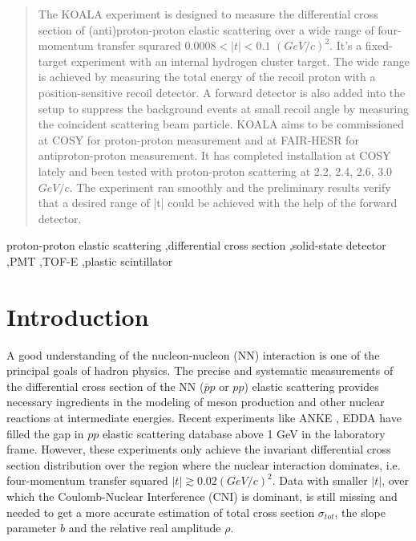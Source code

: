 \documentclass[number,5p]{elsarticle}
\begin{document}
\begin{frontmatter}
\begin{abstract}
    The KOALA experiment is designed to measure the differential cross section
    of (anti)proton-proton elastic scattering over a wide range of four-momentum
    transfer squrared $0.0008 < |t| < 0.1$ $(GeV/c)^2$.
    It's a fixed-target experiment with an internal hydrogen cluster target.
    The wide range is achieved by measuring the total energy of the recoil proton with a
    position-sensitive recoil detector.
    A forward detector is also added into the setup to suppress the background
    events at small recoil angle by measuring the coincident scattering beam particle.
    KOALA aims to be commissioned at COSY for proton-proton measurement and at
    FAIR-HESR for antiproton-proton measurement.
    It has completed installation at COSY lately and been tested with proton-proton
    scattering at 2.2, 2.4, 2.6, 3.0 $GeV/c$.
    The experiment ran smoothly and the preliminary results verify that a desired range of |t| could be achieved with the help of
    the forward detector.

  \end{abstract}

  \begin{keyword}
    proton-proton elastic scattering 
    \sep differential cross section
    \sep solid-state detector
    \sep PMT
    \sep TOF-E
    \sep plastic scintillator
  \end{keyword}

\end{frontmatter}



\section{Introduction}
\label{sec:introduction}

A good understanding of the nucleon-nucleon (NN) interaction is one of the principal goals of hadron physics.
The precise and systematic measurements of the differential cross section of the
NN ($\bar{p}p$ or $pp$) elastic scattering provides necessary ingredients
in the modeling of meson production and other nuclear reactions at intermediate energies.
Recent experiments like ANKE \cite{ANKE}, EDDA \cite{EDDA} have filled the gap
in $pp$ elastic scattering database above 1 GeV in the laboratory frame.
However, these experiments only achieve the invariant differential cross section distribution over the region where the nuclear interaction dominates, 
i.e. four-momentum transfer squared \(|t| \gtrsim 0.02 (GeV/c)^2\).
Data with smaller \(|t|\), over which the Coulomb-Nuclear Interference (CNI) is dominant, is still missing and needed to get a more accurate estimation of total cross section \({\sigma}_{tot}\), the slope parameter \(b\) and the relative real amplitude \(\rho\).
\end{document}
